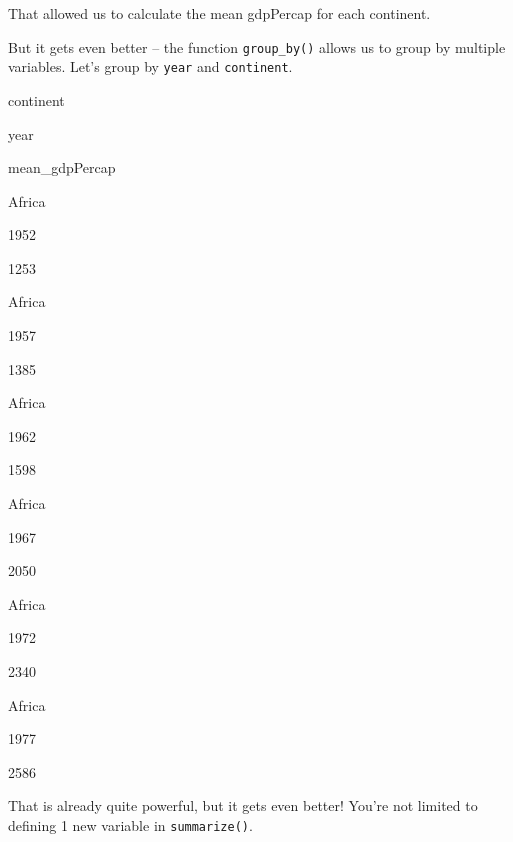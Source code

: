 \documentclass[]{book}
\newenvironment{Shaded}{\begin{snugshade}}{\end{snugshade}}
\newcommand{\KeywordTok}[1]{\textcolor[rgb]{0.13,0.29,0.53}{\textbf{#1}}}
\newcommand{\DataTypeTok}[1]{\textcolor[rgb]{0.13,0.29,0.53}{#1}}
\newcommand{\StringTok}[1]{\textcolor[rgb]{0.31,0.60,0.02}{#1}}
\newcommand{\OperatorTok}[1]{\textcolor[rgb]{0.81,0.36,0.00}{\textbf{#1}}}
\newcommand{\NormalTok}[1]{#1}
\begin{document}
That allowed us to calculate the mean gdpPercap for each continent.

But it gets even better -- the function \texttt{group\_by()} allows us
to group by multiple variables. Let's group by \texttt{year} and
\texttt{continent}.

\begin{Shaded}
\end{Shaded}

continent

year

mean\_gdpPercap

Africa

1952

1253

Africa

1957

1385

Africa

1962

1598

Africa

1967

2050

Africa

1972

2340

Africa

1977

2586

That is already quite powerful, but it gets even better! You're not
limited to defining 1 new variable in \texttt{summarize()}.

\begin{Shaded}
\end{Shaded}
\end{document}
